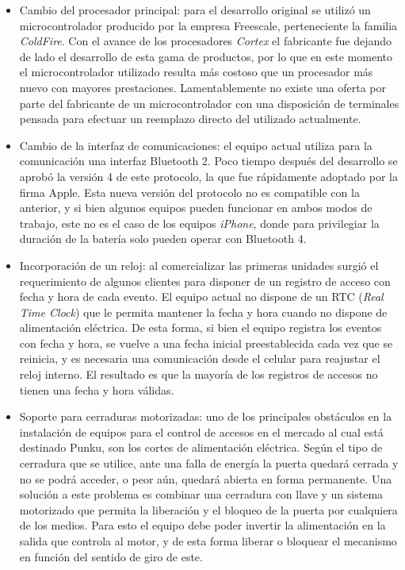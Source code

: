 \begin{itemize}
	\item Cambio del procesador principal: para el desarrollo original se utilizó un microcontrolador producido por la empresa Freescale, perteneciente la familia \emph{ColdFire}. Con el avance de los procesadores \emph{Cortex} el fabricante fue dejando de lado el desarrollo de esta gama de productos, por lo que en este momento el microcontrolador utilizado resulta más costoso que un procesador más nuevo con mayores prestaciones. Lamentablemente no existe una oferta por parte del fabricante de un microcontrolador con una disposición de terminales pensada para efectuar un reemplazo directo del utilizado actualmente.
	
	\item Cambio de la interfaz de comunicaciones: el equipo actual utiliza para la comunicación una interfaz Bluetooth 2. Poco tiempo después del desarrollo se aprobó la versión 4 de este protocolo, la que fue rápidamente adoptado por la firma Apple. Esta nueva versión del protocolo no es compatible con la anterior, y si bien algunos equipos pueden funcionar en ambos modos de trabajo, este no es el caso de los equipos \emph{iPhone}, donde para privilegiar la duración de la batería solo pueden operar con Bluetooth 4.
	
	\item Incorporación de un reloj: al comercializar las primeras unidades surgió el requerimiento de algunos clientes para disponer de un registro de acceso con fecha y hora de cada evento. El equipo actual no dispone de un RTC (\emph{Real Time Clock}) que le permita mantener la fecha y hora cuando no dispone de alimentación eléctrica. De esta forma, si bien el equipo registra los eventos con fecha y hora, se vuelve a una fecha inicial preestablecida cada vez que se reinicia, y es necesaria una comunicación desde el celular para reajustar el reloj interno. El resultado es que la mayoría de los registros de accesos no tienen una fecha y hora válidas.
	
	\item Soporte para cerraduras motorizadas: uno de los principales obstáculos en la instalación de equipos para el control de accesos en el mercado al cual está destinado Punku, son los cortes de alimentación eléctrica. Según el tipo de cerradura que se utilice, ante una falla de energía la puerta quedará cerrada y no se podrá acceder, o peor aún, quedará abierta en forma permanente. Una solución a este problema es combinar una cerradura con llave y un sistema motorizado que permita la liberación y el bloqueo de la puerta por cualquiera de los medios. Para esto el equipo debe poder invertir la alimentación en la salida que controla al motor, y de esta forma liberar o bloquear el mecanismo en función del sentido de giro de este.
	

\end{itemize}
